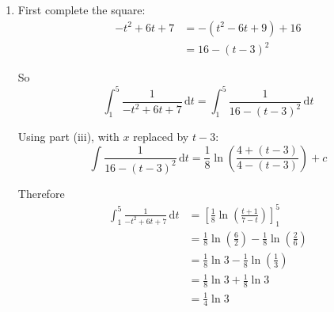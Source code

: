 \documentclass[leqno]{article}
\begin{document}
\begin{enumerate}[
  label=\textbf{\arabic*.},
  leftmargin=*,
  topsep=0pt,
  partopsep=0pt,
  parsep=0pt
]
\begin{djsSolution}
\begin{enumerate}[label=\textbf{(\roman*)}]
Also
\begin{align*}
16-x^2
&=16-16\tanh^2u \\
&=16(1-\tanh^2u) \\
&=16\operatorname{sech}^2u
\end{align*}

using part (i).

So
\begin{align*}
\int \frac{1}{16-x^2}\,\mathrm{d}x
&=\int \frac{1}{16\operatorname{sech}^2u}\left(4\operatorname{sech}^2u\,\mathrm{d}u\right) \\
&=\frac14\int 1\,\mathrm{d}u \\
&=\frac{u}{4}+c
\end{align*}

Now $x=4\tanh u$ gives
\[
\tanh u=\frac{x}{4}
\]

so
\[
u=\operatorname{artanh}\frac{x}{4}
\]

Hence
\[
\int \frac{1}{16-x^2}\,\mathrm{d}x=\frac14\operatorname{artanh}\frac{x}{4}+c
\]

for $|x|<4$.

Now use part (ii) with $y=\frac{x}{4}$. Since $|x|<4$, we have $\left|\frac{x}{4}\right|<1$, so
\[
\operatorname{artanh}\frac{x}{4}
=\frac12\ln\left(\frac{1+\frac{x}{4}}{1-\frac{x}{4}}\right)
=\frac12\ln\left(\frac{4+x}{4-x}\right)
\]

Therefore
\[
\int \frac{1}{16-x^2}\,\mathrm{d}x
=\frac14\times\frac12\ln\left(\frac{4+x}{4-x}\right)+c
=\frac18\ln\left(\frac{4+x}{4-x}\right)+c
\]

\item First complete the square:
\begin{align*}
-t^2+6t+7
&=-(t^2-6t+9)+16 \\
&=16-(t-3)^2
\end{align*}

So
\[
\int_1^5 \frac{1}{-t^2+6t+7}\,\mathrm{d}t
=
\int_1^5 \frac{1}{16-(t-3)^2}\,\mathrm{d}t
\]

Using part (iii), with $x$ replaced by $t-3$:
\[
\int \frac{1}{16-(t-3)^2}\,\mathrm{d}t
=
\frac18\ln\left(\frac{4+(t-3)}{4-(t-3)}\right)+c
\]

Therefore
\begin{align*}
\int_1^5 \frac{1}{-t^2+6t+7}\,\mathrm{d}t
&=
\left[\frac18\ln\left(\frac{t+1}{7-t}\right)\right]_{1}^{5} \\
&=\frac18\ln\left(\frac{6}{2}\right)-\frac18\ln\left(\frac{2}{6}\right) \\
&=\frac18\ln 3-\frac18\ln\left(\frac13\right) \\
&=\frac18\ln 3+\frac18\ln 3 \\
&=\frac14\ln 3
\end{align*}
\end{enumerate}
\end{djsSolution}



\end{enumerate}
\end{document}
